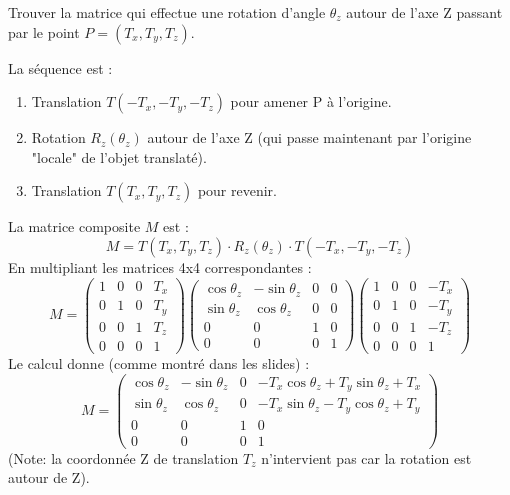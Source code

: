 \begin{example}
Trouver la matrice qui effectue une rotation d'angle \( \theta_z \) autour de l'axe Z passant par le point \( P = (T_x, T_y, T_z) \).
\begin{solution}
La séquence est :
\begin{enumerate}
    \item Translation \( T(-T_x, -T_y, -T_z) \) pour amener P à l'origine.
    \item Rotation \( R_z(\theta_z) \) autour de l'axe Z (qui passe maintenant par l'origine "locale" de l'objet translaté).
    \item Translation \( T(T_x, T_y, T_z) \) pour revenir.
\end{enumerate}
La matrice composite \( M \) est :
\[ M = T(T_x, T_y, T_z) \cdot R_z(\theta_z) \cdot T(-T_x, -T_y, -T_z) \]
En multipliant les matrices 4x4 correspondantes :
\[ M = \begin{pmatrix} 1 & 0 & 0 & T_x \\ 0 & 1 & 0 & T_y \\ 0 & 0 & 1 & T_z \\ 0 & 0 & 0 & 1 \end{pmatrix} \begin{pmatrix} \cos\theta_z & -\sin\theta_z & 0 & 0 \\ \sin\theta_z & \cos\theta_z & 0 & 0 \\ 0 & 0 & 1 & 0 \\ 0 & 0 & 0 & 1 \end{pmatrix} \begin{pmatrix} 1 & 0 & 0 & -T_x \\ 0 & 1 & 0 & -T_y \\ 0 & 0 & 1 & -T_z \\ 0 & 0 & 0 & 1 \end{pmatrix} \]
Le calcul donne (comme montré dans les slides) :
\[ M = \begin{pmatrix} \cos\theta_z & -\sin\theta_z & 0 & -T_x \cos\theta_z + T_y \sin\theta_z + T_x \\ \sin\theta_z & \cos\theta_z & 0 & -T_x \sin\theta_z - T_y \cos\theta_z + T_y \\ 0 & 0 & 1 & 0 \\ 0 & 0 & 0 & 1 \end{pmatrix} \]
(Note: la coordonnée Z de translation \(T_z\) n'intervient pas car la rotation est autour de Z).
\end{solution}
\end{example}
